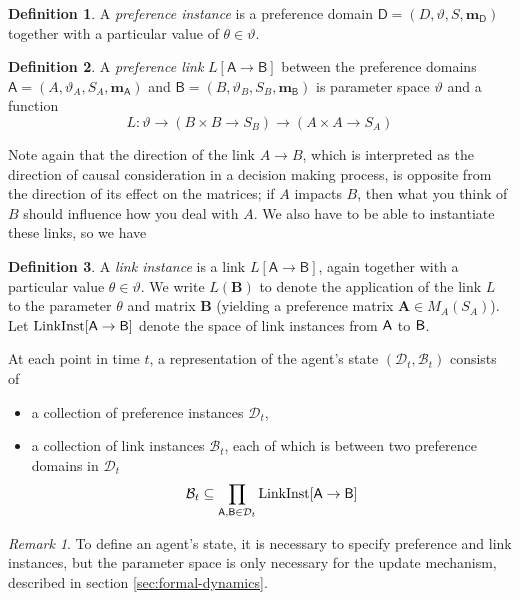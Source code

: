 \documentclass{article}
\theoremstyle{plain}
\theoremstyle{definition}
\newtheorem{defn}{Definition}[section]
\theoremstyle{remark}
\newtheorem*{remark}{Remark}
\newcommand\mat[1]{\mathbf #1}
\newcommand\m[1]{\mathbf m_{\mathsf #1}}
\begin{document}
	\begin{defn}
		 A \emph{preference instance} is a preference domain $\mathsf D = (D, \vartheta, S, \m D)$ together with a particular value of $\theta \in \vartheta$.
		 
	\end{defn}

	\begin{defn}
		A \emph{preference link} $L [\mathsf A \to \mathsf B]$ between the preference domains $\mathsf A = (A, \vartheta_A, S_A, \m A)$ and $\mathsf B = (B, \vartheta_B, S_B, \m B)$ is parameter space $\vartheta$ and a function 
		\[ L : \vartheta \to (B \times B \to S_B) \to (A \times A \to S_A)  \]
	\end{defn}
	Note again that the direction of the link $A \to B$, which is interpreted as the direction of causal consideration in a decision making process, is opposite from the direction of its effect on the matrices; if $A$ impacts $B$, then what you think of $B$ should influence how you deal with $A$. We also have to be able to instantiate these links, so we have
	\begin{defn}
		 A \emph{link instance} is a link $L [\mathsf A \to \mathsf B]$, again together with a particular value $\theta \in \vartheta$. We write $L ( \mat B )$ to denote the application of the link $L$ to the parameter $\theta $ and matrix $\mat B$ (yielding a preference matrix $\mat A \in M_A(S_A)$). 
		 Let $\mathrm{LinkInst}[{\sf A \to B}]$ denote the space of link instances from $\sf A$ to $\sf B$.
	\end{defn}
	
	
	At each point in time $t$, a representation of the agent's state $(\mathcal D_t, \mathcal B_t)$ consists of 
	

	\begin{itemize}[nosep]
		\item a collection of preference instances $\mathcal D_t$, %
		
		\item a collection of link instances $\mathcal B_t$, each of which is between two preference domains in $\mathcal D_t$
		\[  \mathcal B_t \subseteq \prod_{{\sf A, B} \in \mathcal D_t}  \mathrm{LinkInst}[{\sf A \to B}] \]	
	\end{itemize}
	
		
	\begin{remark}
		To define an agent's state, it is necessary to specify preference and link instances, but the parameter space is only necessary for the update mechanism, described in section \ref{sec:formal-dynamics}.
	\end{remark}
 
\end{document}
